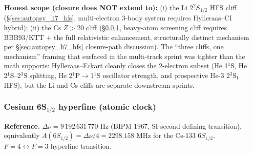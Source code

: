 \documentclass[11pt]{article}
\begin{document}
\textbf{Honest scope (closure does NOT extend to):}
(i) the Li $2^2S_{1/2}$ HFS cliff (\S\ref{sec:autopsy_li7_hfs}, multi-electron
3-body system requires Hylleraas--CI hybrid); (ii) the Cs $Z > 20$ cliff
(\S\ref{sec:autopsy_cs_hfs}, heavy-atom screening cliff requires BBB93/KTT
$+$ the full relativistic enhancement, structurally distinct mechanism per \S\ref{sec:autopsy_li7_hfs}
closure-path discussion).  The ``three cliffs, one mechanism'' framing
that surfaced in the multi-track sprint was tighter than the math
supports: Hylleraas--Eckart cleanly closes the 2-electron subset
(He 1$^1$S, He 2$^1$S--2$^3$S splitting, He 2$^1$P$\to$1$^1$S oscillator
strength, and prospective He-3 2$^3$S$_1$ HFS), but the Li and Cs cliffs
are separate downstream sprints.

\subsubsection{Cesium 6S$_{1/2}$ hyperfine (atomic clock)}
\label{sec:autopsy_cs_hfs}

\textbf{Reference.}  $\Delta\nu = 9\,192\,631\,770$ Hz (BIPM 1967,
SI-second-defining transition), equivalently
$A(6S_{1/2}) = \Delta\nu/4 = 2298.158$ MHz for the
Cs-133 $6S_{1/2}$, $F=4 \leftrightarrow F=3$ hyperfine transition.
\end{document}
